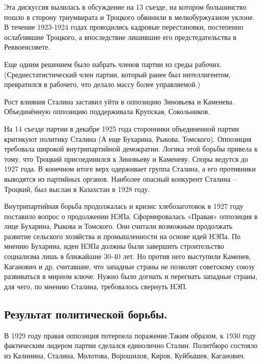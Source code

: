 Эта дискуссия вылилась в обсуждение на 13 съезде, на котором большинство пошло в сторону триумвирата и Троцкого обвинили в мелкобуржуазном уклоне. В течение 1923-1924 годах проводились кадровые перестановки, постепенно ослаблявшие Троцкого, а впоследствие лишившие его предстедательства в Реввоенсовете. 

Еще одним решением было набрать членов партии из среды рабочих. (Среднестатистический член партии, который ранее был интеллигентом, превратился в рабочего, что делало массу более управляемой.)

Рост влияния Сталина заставил уйти в оппозицию Зиновьева и Каменева. Объединённую оппозицию поддерживала Крупская, Сокольников.

На 14 съезде партии в декабре 1925 года сторонники объединенной партии критикуют политику Сталина (А еще Бухарина, Рыкова, Томского). Оппозиция требовала широкой внутрипартийной демократии. Логика этой борьбы привела к тому, что Троцкий присоединился к Зиновьеву и Каменеву. Споры ведутся до 1927 года. В конечном итоге верх одерживает группа Сталина, а его противники выводятся из партийных органов. Наиболее опасный конкурент Сталина – Троцкий, был выслан в Казахстан в 1928 году.

Внутрипартийная борьба продолжалась и кризис хлебозаготовок в 1927 году поставило вопрос о продолжении НЭПа. Сформировалась «Правая» оппозиция в лице Бухарина, Рыкова и Томского. Они считали возможным продолжать развитие сельского хозяйства и промышленности на основе идей НЭПа. По мнению Бухарина, идеи НЭПа должны были завершить строительство социализма лишь в ближайшие 30-40 лет. Но против него выступили Каменев, Каганович и др, считавшие, что западные страны не позволят советскому союзу развиваться в мирном ключе. Нужно было догнать и перегнать западные страны, для чего, по мнению Сталина, требовалось свернуть НЭП. 

\subsection{Результат политической борьбы.}

В 1929 году правая оппозиция потерпела поражение.Таким образом, к 1930 году фактическим лидером партии сделался единолично Сталин. Политбюро состояло из Калинина, Сталина, Молотова, Ворошилов, Киров, Куйбышев, Каганович.